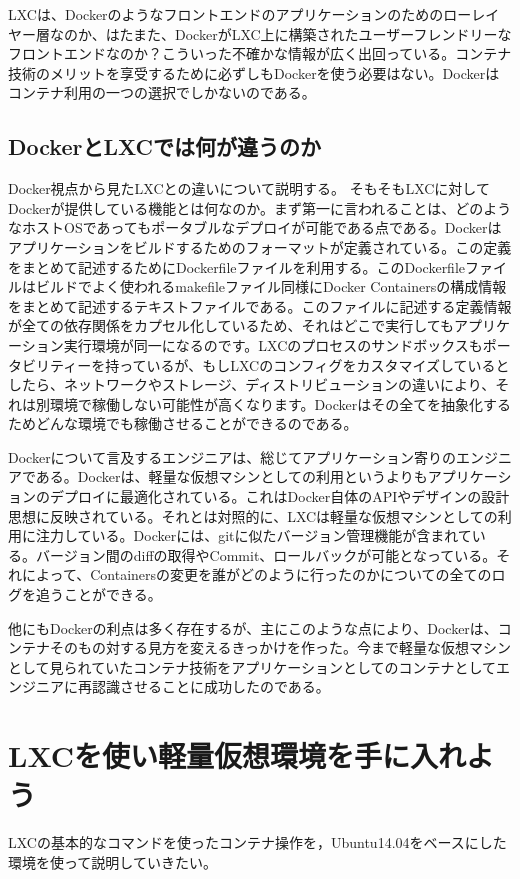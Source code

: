 \documentclass[9pt,b5paper,tombo]{jsbook}
\begin{document}
LXCは、Dockerのようなフロントエンドのアプリケーションのためのローレイヤー層なのか、はたまた、DockerがLXC上に構築されたユーザーフレンドリーなフロントエンドなのか？こういった不確かな情報が広く出回っている。コンテナ技術のメリットを享受するために必ずしもDockerを使う必要はない。Dockerはコンテナ利用の一つの選択でしかないのである。

\subsection{DockerとLXCでは何が違うのか}
Docker視点から見たLXCとの違いについて説明する。
そもそもLXCに対してDockerが提供している機能とは何なのか。まず第一に言われることは、どのようなホストOSであってもポータブルなデプロイが可能である点である。Dockerはアプリケーションをビルドするためのフォーマットが定義されている。この定義をまとめて記述するためにDockerfileファイルを利用する。このDockerfileファイルはビルドでよく使われるmakefileファイル同様にDocker Containersの構成情報をまとめて記述するテキストファイルである。このファイルに記述する定義情報が全ての依存関係をカプセル化しているため、それはどこで実行してもアプリケーション実行環境が同一になるのです。LXCのプロセスのサンドボックスもポータビリティーを持っているが、もしLXCのコンフィグをカスタマイズしているとしたら、ネットワークやストレージ、ディストリビューションの違いにより、それは別環境で稼働しない可能性が高くなります。Dockerはその全てを抽象化するためどんな環境でも稼働させることができるのである。

Dockerについて言及するエンジニアは、総じてアプリケーション寄りのエンジニアである。Dockerは、軽量な仮想マシンとしての利用というよりもアプリケーションのデプロイに最適化されている。これはDocker自体のAPIやデザインの設計思想に反映されている。それとは対照的に、LXCは軽量な仮想マシンとしての利用に注力している。Dockerには、gitに似たバージョン管理機能が含まれている。バージョン間のdiffの取得やCommit、ロールバックが可能となっている。それによって、Containersの変更を誰がどのように行ったのかについての全てのログを追うことができる。

他にもDockerの利点は多く存在するが、主にこのような点により、Dockerは、コンテナそのもの対する見方を変えるきっかけを作った。今まで軽量な仮想マシンとして見られていたコンテナ技術をアプリケーションとしてのコンテナとしてエンジニアに再認識させることに成功したのである。

\newpage

\section{LXCを使い軽量仮想環境を手に入れよう}
LXCの基本的なコマンドを使ったコンテナ操作を，Ubuntu14.04をベースにした環境を使って説明していきたい。
\end{document}
